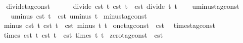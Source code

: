 \begin{isabellebody}
\isanewline
\ \ \isamarkupfalse%
\ divide{\isacharunderscore}tag{\isacharunderscore}const\ \isanewline
\ \ \ \ \ {\isacartoucheopen}divide\ {\isacharparenleft}{\isasymtau}\isactrlsub c\isactrlsub s\isactrlsub t\ t\ {\isacharparenleft}{\isasymtau}\isactrlsub c\isactrlsub s\isactrlsub t\ t\ {\isacharequal}\ {\isasymtau}\isactrlsub c\isactrlsub s\isactrlsub t\ {\isacharparenleft}divide\ t\ t\isanewline
\isanewline
\ \ \isamarkupfalse%
\ uminus{\isacharunderscore}tag{\isacharunderscore}const\isanewline
\ \ \ \ \ {\isacartoucheopen}uminus\ {\isacharparenleft}{\isasymtau}\isactrlsub c\isactrlsub s\isactrlsub t\ t{\isacharparenright}\ {\isacharequal}\ {\isasymtau}\isactrlsub c\isactrlsub s\isactrlsub t\ {\isacharparenleft}uminus\ t{\isacharparenright}{\isacartoucheclose}\isanewline
\isanewline
{}\isamarkupfalse%
\ minus{\isacharunderscore}tag{\isacharunderscore}const\isanewline
\ \ \ {\isacartoucheopen}minus\ {\isacharparenleft}{\isasymtau}\isactrlsub c\isactrlsub s\isactrlsub t\ t\ {\isacharparenleft}{\isasymtau}\isactrlsub c\isactrlsub s\isactrlsub t\ t\ {\isacharequal}\ {\isasymtau}\isactrlsub c\isactrlsub s\isactrlsub t\ {\isacharparenleft}minus\ t\ t\isanewline
\isanewline
{}\isamarkupfalse%
\ {\isacartoucheopen}one{\isacharunderscore}tag{\isacharunderscore}const\ {\isasymequiv}\ {\isasymtau}\isactrlsub c\isactrlsub s\isactrlsub t\ {}{\isacartoucheclose}\isanewline
\isanewline
{}\isamarkupfalse%
\ times{\isacharunderscore}tag{\isacharunderscore}const\isanewline
\ \ \ {\isacartoucheopen}times\ {\isacharparenleft}{\isasymtau}\isactrlsub c\isactrlsub s\isactrlsub t\ t\ {\isacharparenleft}{\isasymtau}\isactrlsub c\isactrlsub s\isactrlsub t\ t\ {\isacharequal}\ {\isasymtau}\isactrlsub c\isactrlsub s\isactrlsub t\ {\isacharparenleft}times\ t\ t\isanewline
\isanewline
{}\isamarkupfalse%
\ {\isacartoucheopen}zero{\isacharunderscore}tag{\isacharunderscore}const\ {\isasymequiv}\ {\isasymtau}\isactrlsub c\isactrlsub s\isactrlsub t\ {}{\isacartoucheclose}\isanewline

\end{isabellebody}
